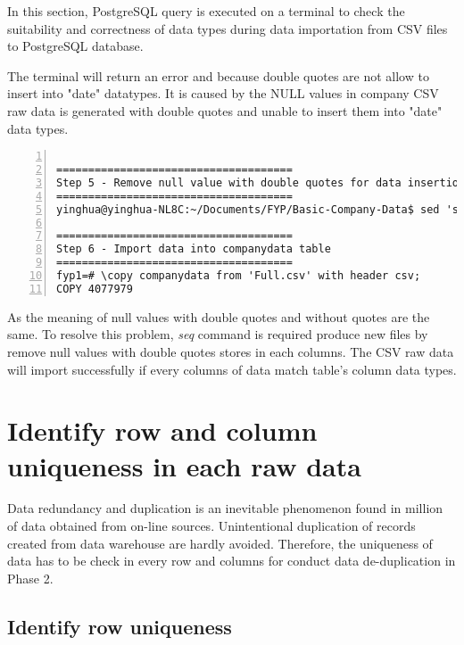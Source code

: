 In this section, PostgreSQL query is executed on a terminal to check the suitability and correctness of data types during data importation from CSV files to PostgreSQL database. 

The terminal will return an error and because double quotes are not allow to insert into "date" datatypes. It is caused by the NULL values in company CSV raw data is generated with double quotes and unable to insert them into "date" data types. 

\pagebreak

\lstset{basicstyle=\ttfamily\tiny} 
\begin{lstlisting}[breaklines, frame=single, numbers=left, caption={Remove null values with double quotes in CSV raw data}, label=commandline-02]

=====================================
Step 5 - Remove null value with double quotes for data insertion on DATE DATATYPE
=====================================
yinghua@yinghua-NL8C:~/Documents/FYP/Basic-Company-Data$ sed 's/""//g' Basic-Company-Data-Full.csv > Full.csv

=====================================
Step 6 - Import data into companydata table
=====================================
fyp1=# \copy companydata from 'Full.csv' with header csv;
COPY 4077979

\end{lstlisting}

As the meaning of null values with double quotes and without quotes are the same. To resolve this problem, \textit{seq} command is required produce new files by remove null values with double quotes stores in each columns. The CSV raw data will import successfully if every columns of data match table's column data types. 

\pagebreak

\section{Identify row and column uniqueness in each raw data}

Data redundancy and duplication is an inevitable phenomenon found in million of data obtained from on-line sources. Unintentional duplication of records created from data warehouse are hardly avoided. Therefore, the uniqueness of data has to be check in every row and columns for conduct data de-duplication in Phase 2.
\newline

\subsection{Identify row uniqueness}

